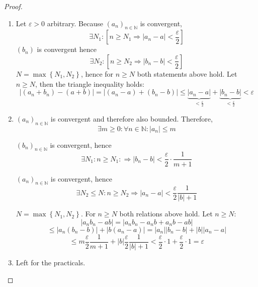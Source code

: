 \documentclass[a4paper,landscape,twocolumn]{article}
\newcommand\set[1]{\left\{#1\right\}}
\newcommand\abs[1]{\left|#1\right|}
\newcommand\seq[1]{{\left(#1\right)}_{n \in \mathbb N}}
\begin{document}
\begin{proof}
  \begin{enumerate}
    \item Let $\varepsilon > 0$ arbitrary. Because $(a_n)_{n \in \mathbb N}$ is convergent,
      \[ \exists N_1: \left[n \geq N_1 \Rightarrow \abs{a_n - a} < \frac{\varepsilon}{2}\right] \]
      $(b_n)$ is convergent hence
      \[ \exists N_2: \left[n \geq N_2 \Rightarrow \abs{b_n - b} < \frac{\varepsilon}2\right] \]
      $N = \max\set{N_1, N_2}$, hence for $n \geq N$ both statements above hold.
      Let $n \geq N$, then the triangle inequality holds:
      \[
          \abs{(a_n + b_n) - (a + b)}
          = \abs{(a_n - a) + (b_n - b)}
          \leq \underbrace{\abs{a_n - a}}_{<\frac\varepsilon2} + \underbrace{\abs{b_n - b}}_{<\frac\varepsilon2} < \varepsilon
      \]

    \item $(a_n)_{n \in \mathbb N}$ is convergent and therefore also bounded. Therefore,
      \[ \exists m \geq 0: \forall n \in \mathbb N: \abs{a_n} \leq m \]

      $\seq{b_n}$ is convergent, hence
      \[ \exists N_1: n \geq N_1: \Rightarrow \abs{b_n - b} < \frac\varepsilon2 \cdot \frac1{m+1} \]

      $(a_n)_{n \in \mathbb N}$ is convergent, hence
      \[ \exists N_2 \leq N: n \geq N_2 \Rightarrow \abs{a_n - a} < \frac\varepsilon2 \frac{1}{\abs{b} + 1} \]

      $N = \max\set{N_1, N_2}$. For $n \geq N$ both relations above hold.
      Let $n \geq N:$
      \[
          \abs{a_n b_n - ab}
          = \abs{a_n b_n - a_n b + a_n b - ab}
      \] \[
          \leq \abs{a_n (b_n - b)} + \abs{b(a_n - a)} = \abs{a_n} \abs{b_n - b} + \abs{b} \abs{a_n - a}
      \] \[
          \leq m \frac{\varepsilon}{2} \frac{1}{m+1} + \abs{b} \frac{\varepsilon}{2} \frac{1}{\abs{b} + 1} < \frac{\varepsilon}{2} \cdot 1 + \frac{\varepsilon}{2} \cdot 1 = \varepsilon
      \]
    \item Left for the practicals.
  \end{enumerate}
\end{proof}
\end{document}
